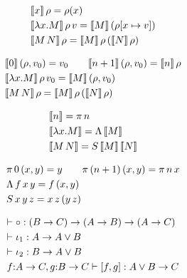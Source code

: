 
\begin{equation*}
  \begin{lgathered}
    \sem{x}\,\rho = \rho(x) \\
    \sem{\lambda x.M}\,\rho\,v = \sem{M}\,(\rho[x \mapsto v]) \\
    \sem{M\,N}\,\rho = \sem{M}\,\rho\,(\sem{N}\,\rho)
  \end{lgathered}
\end{equation*}

\begin{equation*}
  \begin{lgathered}
    \sem{0}\,(\rho, v_0) = v_0 \qquad \sem{n+1}\,(\rho, v_0) = \sem{n}\,\rho \\
    \sem{\lambda x.M}\,\rho\,v_0 = \sem{M}\,(\rho, v_0) \\
    \sem{M\,N}\,\rho = \sem{M}\,\rho\,(\sem{N}\,\rho)
  \end{lgathered}
\end{equation*}

\begin{equation*}
  \begin{lgathered}
    \sem{n} = \pi\,n \\
    \sem{\lambda x.M} = \Lambda\,\sem{M} \\
    \sem{M\,N} = S\,\sem{M}\,\sem{N}
  \end{lgathered}
\end{equation*}

\begin{equation*}
  \begin{lgathered}
    \pi\,0\,(x,y) = y \qquad \pi\,(n+1)\,(x,y) = \pi\,n\,x \\
    \Lambda\,f\,x\,y = f\,(x,y) \\
    S\,x\,y\,z = x\,z\,(y\,z)
  \end{lgathered}
\end{equation*}


\begin{equation*}
  \begin{lgathered}
    \vdash \circ : (B \to C) \to (A \to B) \to (A \to C) \\
    \vdash \iota_1 : A \to A \lor B \\
    \vdash \iota_2 : B \to A \lor B \\
    f{:}A \to C, g{:}B \to C \vdash [f,g] : A \lor B \to C
  \end{lgathered}
\end{equation*}

